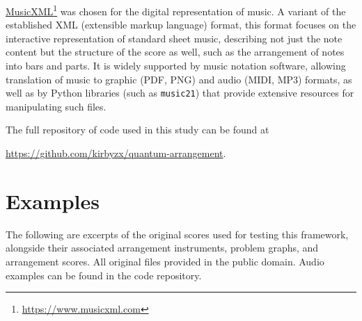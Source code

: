 \documentclass[twocolumn]{article}
\theoremstyle{definition}
\begin{document}
\href{https://www.musicxml.com}{MusicXML}\footnote{\url{https://www.musicxml.com}} was chosen for the digital representation of music. A variant of the established XML (extensible markup language) format, this format focuses on the interactive representation of standard sheet music, describing not just the note content but the structure of the score as well, such as the arrangement of notes into bars and parts. It is widely supported by music notation software, allowing translation of music to graphic (PDF, PNG) and audio (MIDI, MP3) formats, as well as by Python libraries (such as \texttt{music21}) that provide extensive resources for manipulating such files.

The full repository of code used in this study can be found at
\begin{center}
    \url{https://github.com/kirbyzx/quantum-arrangement}.
\end{center}

\section{Examples}
\label{app:examples}

The following are excerpts of the original scores used for testing this framework, alongside their associated arrangement instruments, problem graphs, and arrangement scores. All original files provided in the public domain. Audio examples can be found in the code repository.

\newlength{\scorewidth}
\setlength{\scorewidth}{.88\textwidth}
\end{document}
